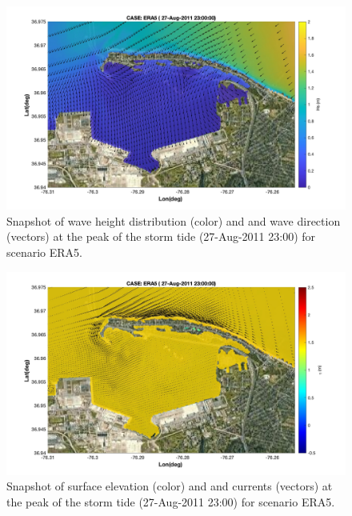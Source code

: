 \documentclass[11pt]{article}
\begin{document}
\begin{figure}[h!]
\centering
\includegraphics[width=\textwidth]{./figures/nearcom_hs_ERA5_91.jpg}
\caption{Snapshot of wave height distribution (color) and and wave direction (vectors) at the peak of the storm tide (27-Aug-2011 23:00) for scenario ERA5. }
\label{ERA5_hs_2}
\centering
\end{figure}

\begin{figure}[h!]
\centering
\includegraphics[width=\textwidth]{./figures/nearcom_ele_ERA5_91.jpg}
\caption{Snapshot of surface elevation (color) and and currents (vectors) at the peak of the storm tide (27-Aug-2011 23:00) for scenario ERA5.}
\label{ERA5_eta_2}
\centering
\end{figure}
\end{document}
